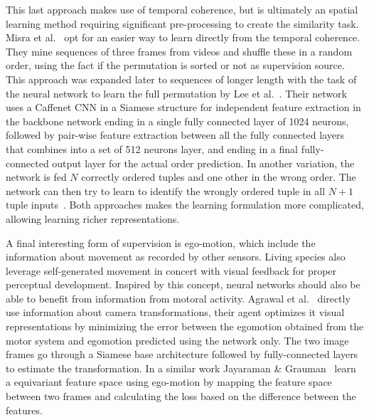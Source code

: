 This last approach makes use of temporal coherence, but is ultimately an spatial learning method requiring significant pre-processing to create the similarity task. Misra et al.~\cite{misra2016} opt for an easier way to learn directly from the temporal coherence. They mine sequences of three frames from videos and shuffle these in a random order, using the fact if the permutation is sorted or not as supervision source. This approach was expanded later to sequences of longer length with the task of the neural network to learn the full permutation by Lee et al.~\cite{lee2017}. Their network uses a Caffenet\cite{jia2014} CNN in a Siamese structure for independent feature extraction in the backbone network ending in a single fully connected layer of 1024 neurons, followed by pair-wise feature extraction between all the fully connected layers that combines into a set of 512 neurons layer, and ending in a final fully-connected output layer for the actual order prediction. In another variation, the network is fed $N$ correctly ordered tuples and one other in the wrong order. The network can then try to learn to identify the wrongly ordered tuple in all $N+1$ tuple inputs~\cite{fernando2017}. Both approaches makes the learning formulation more complicated, allowing learning richer representations\needref. 

A final interesting form of supervision is ego-motion, which include the information about movement as recorded by other sensors. Living species also leverage self-generated movement in concert with visual feedback for proper perceptual development. Inspired by this concept, neural networks should also be able to benefit from information from motoral activity. Agrawal et al.~\cite{agrawal2015} directly use information about camera transformations, their agent optimizes it visual representations by minimizing the error between the egomotion obtained from the motor system and egomotion predicted using the network only. The two image frames go through a Siamese base architecture followed by fully-connected layers to estimate the transformation. In a similar work Jayaraman \& Grauman~\cite{jayaraman2015} learn a equivariant feature space using ego-motion by mapping the feature space between two frames and calculating the loss based on the difference between the features.


